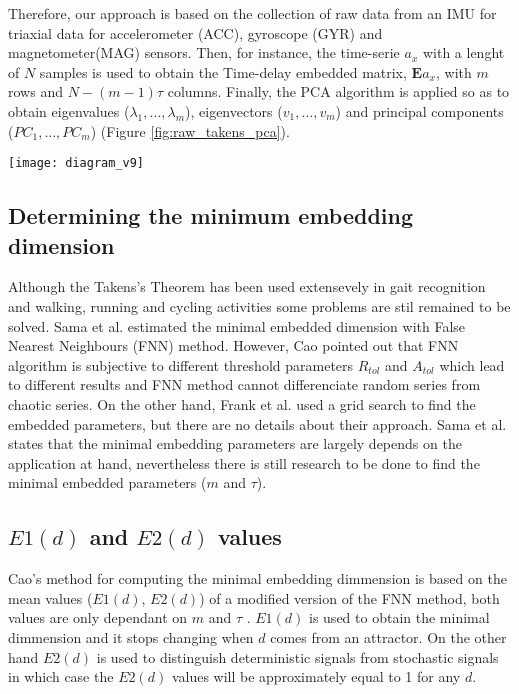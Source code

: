 \documentclass{sigchi}
\begin{document}
Therefore, our approach is based on the collection 
of raw data from an IMU for triaxial data for accelerometer (ACC), gyroscope (GYR) 
and magnetometer(MAG) sensors. Then, for instance, the time-serie $a_x$ with a lenght of 
$N$ samples is used to obtain the Time-delay embedded matrix, 
$\boldsymbol{E} a_{x}$, with $m$ rows and $N-(m-1)\tau$ columns. 
Finally, the PCA algorithm is applied so as to obtain eigenvalues 
($\lambda_1,\ldots,\lambda_m$), eigenvectors ($v_1,\ldots,v_m$) and principal components 
($PC_1,\ldots,PC_m$) (Figure \ref{fig:raw_takens_pca}).
\begin{figure*}[!ht]
\centering    
\texttt{[image: diagram\_v9]}
\caption[PA]{Diagram for the Phase Space Reconstruction.}
\label{fig:raw_takens_pca}
\end{figure*}


\subsection{Determining the minimum embedding dimension}
Although the Takens's Theorem has been used extensevely in gait recognition and walking, running and cycling 
activities some problems are stil remained to be solved.
Sama et al. \cite{Sama2013} estimated the minimal embedded dimension with False Nearest Neighbours (FNN) method.
However, Cao \cite{Cao1997} pointed out that FNN algorithm is subjective to different threshold parameters 
$R_{tol}$ and $A_{tol}$  which lead to different results and FNN method cannot differenciate random series 
from chaotic series. On the other hand, Frank et al. \cite{Frank2010} used a grid search 
to find the embedded parameters, but there are no details about their approach.
Sama et al. \cite{Sama2013} states that the minimal embedding parameters are largely depends on the 
application at hand, nevertheless there is still research to be done to find the minimal 
embedded parameters ($m$ and $\tau$).

\subsection{$E1(d)$ and $E2(d)$ values}
Cao's method for computing the minimal embedding dimmension is based on the mean values ($E1(d)$, $E2(d)$) of a
modified version of the FNN method, both values are only dependant on $m$ and $\tau$ \cite{Cao1997}.
$E1(d)$ is used to obtain the minimal dimmension and it stops changing when $d$ comes from an attractor.
On the other hand $E2(d)$ is used to distinguish deterministic signals from stochastic signals 
in which case the $E2(d)$ values will be approximately equal to 1 for any $d$.
\end{document}
